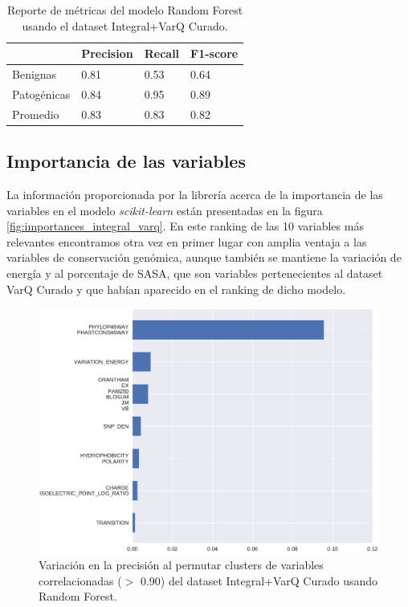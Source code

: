 \begin{table}[H]
\centering
\begin{tabular}{|l|l|l|l|}
\hline
             & Precision & Recall & F1-score \\ \hline
Benignas     & 0.81      & 0.53   & 0.64     \\ \hline
Patogénicas  & 0.84      & 0.95   & 0.89     \\ \hline
Promedio     & 0.83      & 0.83   & 0.82     \\ \hline
\end{tabular}
\caption{Reporte de métricas del modelo Random Forest usando el dataset Integral+VarQ Curado.}
\label{tab:metrics_integral_varq}
\end{table}

\subsection{Importancia de las variables}
La información proporcionada por la librería acerca de la importancia de las variables en el modelo \textit{scikit-learn} están presentadas en la figura \ref{fig:importances_integral_varq}. En este ranking de las 10 variables más relevantes encontramos otra vez en primer lugar con amplia ventaja a las variables de conservación genómica, aunque también se mantiene la variación de energía y al porcentaje de SASA, que son variables pertenecientes al dataset VarQ Curado y que habían aparecido en el ranking de dicho modelo. 

\begin{figure}[H]
    \centering
    \includegraphics[scale=0.7]{documents/latex/figures/3/integral_varq/integral_varq_importance_cluster.pdf}
    \caption{Variación en la precisión al permutar clusters de variables correlacionadas ($>$ 0.90) del dataset Integral+VarQ Curado usando Random Forest.}
    \label{fig:importance_cluster_integral_varq}
\end{figure}


